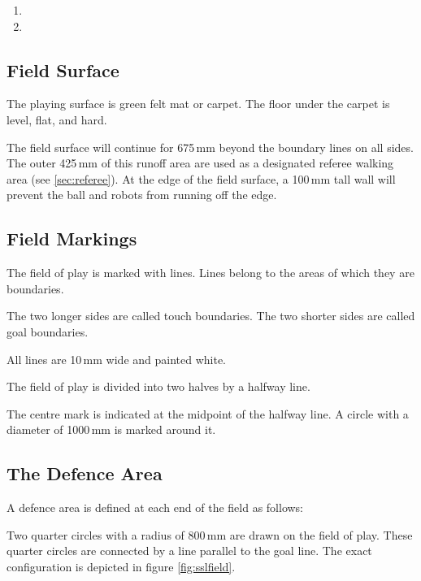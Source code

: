 \begin{enumerate}
\item {}
\item {}
\end{enumerate}

\subsection{Field Surface}
The playing surface is green felt mat or carpet.
The floor under the carpet is level, flat, and hard.

The field surface will continue for 675\,mm beyond the boundary lines on all sides.
The outer 425\,mm of this runoff area are used as a designated referee walking area (see \autoref{sec:referee}).
At the edge of the field surface, a 100\,mm tall wall will prevent the ball and robots from running off the edge.

\subsection{Field Markings}
The field of play is marked with lines.
Lines belong to the areas of which they are boundaries.

The two longer sides are called touch boundaries.
The two shorter sides are called goal boundaries.

All lines are 10\,mm wide and painted white.

The field of play is divided into two halves by a halfway line.

The centre mark is indicated at the midpoint of the halfway line.
A circle with a diameter of 1000\,mm is marked around it.

\subsection{The Defence Area}
A defence area is defined at each end of the field as follows:

Two quarter circles with a radius of 800\,mm are drawn on the field of play.
These quarter circles are connected by a line parallel to the goal line.
The exact configuration is depicted in figure \ref{fig:sslfield}.

